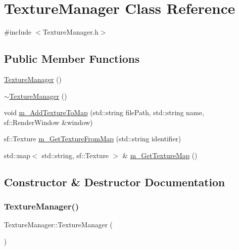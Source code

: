 \hypertarget{class_texture_manager}{}\section{Texture\+Manager Class Reference}
\label{class_texture_manager}


{\ttfamily \#include $<$Texture\+Manager.\+h$>$}

\subsection*{Public Member Functions}
\begin{DoxyCompactItemize}
\item 
\mbox{\hyperlink{class_texture_manager_ad76abb178b37cedf4514eb0154349935}{Texture\+Manager}} ()
\item 
\mbox{\hyperlink{class_texture_manager_a001d6d74674961db79987e3222682576}{$\sim$\+Texture\+Manager}} ()
\item 
void \mbox{\hyperlink{class_texture_manager_a326e1f21bd640317888bb28ec867b1fd}{m\+\_\+\+Add\+Texture\+To\+Map}} (std\+::string file\+Path, std\+::string name, sf\+::\+Render\+Window \&window)
\item 
sf\+::\+Texture \mbox{\hyperlink{class_texture_manager_a68da4749b9ee31a5b8ce79bab3e2e03c}{m\+\_\+\+Get\+Texture\+From\+Map}} (std\+::string identifier)
\item 
std\+::map$<$ std\+::string, sf\+::\+Texture $>$ \& \mbox{\hyperlink{class_texture_manager_a626ba3c25cd4fc4ddacdcd7f6cc4cd3d}{m\+\_\+\+Get\+Texture\+Map}} ()
\end{DoxyCompactItemize}


\subsection{Constructor \& Destructor Documentation}
\mbox{\label{class_texture_manager_ad76abb178b37cedf4514eb0154349935}} 
\subsubsection{\texorpdfstring{Texture\+Manager()}{TextureManager()}}
{\footnotesize\ttfamily Texture\+Manager\+::\+Texture\+Manager (\begin{DoxyParamCaption}{ }\end{DoxyParamCaption})}

